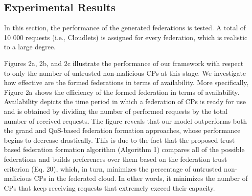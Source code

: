\documentclass[preprint]{elsarticle}
\theoremstyle{definition}
\theoremstyle{remark}
\theoremstyle{property}
\begin{document}
\subsection{Experimental Results}

In this section, the performance of the generated federations is tested. A total of 10 000 requests (i.e., Cloudlets) is assigned for every federation, which is realistic to a large degree.

Figures 2a, 2b, and 2c illustrate the performance of our
framework with respect to only the number of untrusted non-malicious
CPs at this stage. We investigate how effective are the formed federations in terms of availability. More specifically, Figure 2a shows the efficiency
of the formed federation in terms of availability.
Availability depicts the time period in which a federation
of CPs is ready for use and is obtained by dividing
the number of performed requests by the total number
of received requests. The figure reveals that our model
outperforms both the grand and QoS-based federation formation approaches,
whose performance begins to decrease drastically. This
is due to the fact that the proposed trust-based federation formation algorithm (Algorithm 1) compares all of the possible federations
and builds preferences over them based on the federation trust criterion (Eq. 20), which, in turn,
minimizes the percentage of untrusted non-malicious CPs
in the federated cloud. In other words, it minimizes
the number of CPs that keep receiving requests that extremely exceed their capacity.
\end{document}

